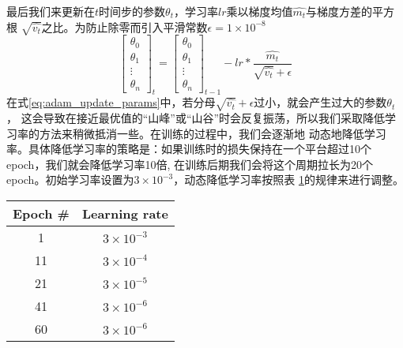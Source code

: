 \noindent{}最后我们来更新在$t$时间步的参数$\theta_{t}$，学习率$lr$乘以梯度均值$\widehat{m_t}$与梯度方差的平方根
$\sqrt{\widehat{v_t}}$之比。为防止除零而引入平滑常数$\epsilon = 1 \times {10}^{-8}$
\begin{equation}\label{eq:adam_update_params}
    \begin{bmatrix}
        \theta_{0} \\
        \theta_{1} \\
        \vdots \\
        \theta_{n}
    \end{bmatrix}_{t} = 
    \begin{bmatrix}
        \theta_{0} \\
        \theta_{1} \\
        \vdots \\
        \theta_{n}
    \end{bmatrix}_{t-1} -
    {lr} * \frac{\widehat{m_t}}{\sqrt{\widehat{v_t}} + \epsilon}
\end{equation}
在式\ref{eq:adam_update_params}中，若分母$\sqrt{\widehat{v_t}}+\epsilon$过小，就会产生过大的参数$\theta_{t}$，
这会导致在接近最优值的“山峰”或“山谷”时会反复振荡，所以我们采取降低学习率的方法来稍微抵消一些。在训练的过程中，我们会逐渐地
动态地降低学习率。具体降低学习率的策略是：如果训练时的损失保持在一个平台超过10个epoch，我们就会降低学习率10倍, 
在训练后期我们会将这个周期拉长为20个epoch。初始学习率设置为$3 \times {10}^{-3}$，动态降低学习率按照表
\ref{tbl:descend_lr}的规律来进行调整。
\begin{table}[!htp]
    \label{tbl:descend_lr}
    \centering
    \begin{tabular}{cc}
        \toprule
        Epoch \# & Learning rate \\
        \midrule
        1 & $3 \times {10}^{-3}$ \\
        11 & $3 \times {10}^{-4}$ \\
        21 & $3 \times {10}^{-5}$ \\
        41 & $3 \times {10}^{-6}$ \\
        60 & $3 \times {10}^{-6}$ \\
        \bottomrule
    \end{tabular}
\end{table}


